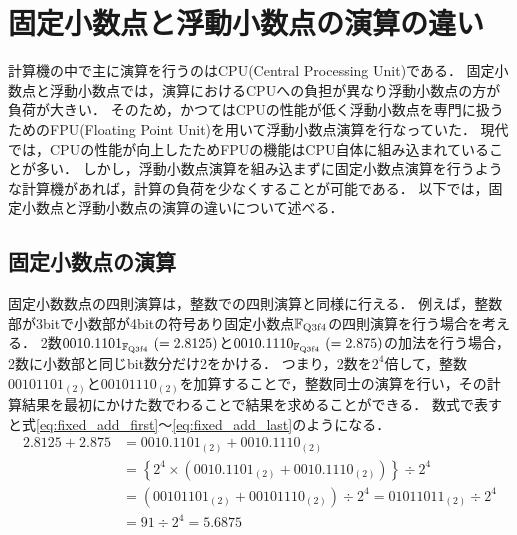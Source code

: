 \section{固定小数点と浮動小数点の演算の違い}
計算機の中で主に演算を行うのはCPU(Central Processing Unit)である．
固定小数点と浮動小数点では，演算におけるCPUへの負担が異なり浮動小数点の方が負荷が大きい．
そのため，かつてはCPUの性能が低く浮動小数点を専門に扱うためのFPU(Floating Point Unit)を用いて浮動小数点演算を行なっていた．
現代では，CPUの性能が向上したためFPUの機能はCPU自体に組み込まれていることが多い．
しかし，浮動小数点演算を組み込まずに固定小数点演算を行うような計算機があれば，計算の負荷を少なくすることが可能である．
以下では，固定小数点と浮動小数点の演算の違いについて述べる．

\subsection{固定小数点の演算}
固定小数数点の四則演算は，整数での四則演算と同様に行える．
例えば，整数部が3bitで小数部が4bitの符号あり固定小数点$\mathbb{F}_{\text{Q}{3}\text{f}{4}}$の四則演算を行う場合を考える．
2数$0010.1101_{\mathbb{F}_{\text{Q}{3}\text{f}{4}}} \ (= 2.8125)$と$0010.1110_{\mathbb{F}_{\text{Q}{3}\text{f}{4}}} \ (= 2.875)$の加法を行う場合，2数に小数部と同じbit数分だけ2をかける．
つまり，2数を$2^4$倍して，整数$00101101_{(2)}$と$00101110_{(2)}$を加算することで，整数同士の演算を行い，その計算結果を最初にかけた数でわることで結果を求めることができる．
数式で表すと式\eqref{eq:fixed_add_first}〜\eqref{eq:fixed_add_last}のようになる．
\begin{align}
    2.8125 + 2.875 &=
    0010.1101_{(2)} + 0010.1110_{(2)} \label{eq:fixed_add_first} \\
    &= \left\{ 2^4 \times \left(0010.1101_{(2)} + 0010.1110_{(2)}\right) \right\} \div 2^4 \\
    &= \left(00101101_{(2)} + 00101110_{(2)} \right) \div 2^4= 01011011_{(2)} \div 2^4\\
    &= 91 \div 2^4 = 5.6875 \label{eq:fixed_add_last}
\end{align}

